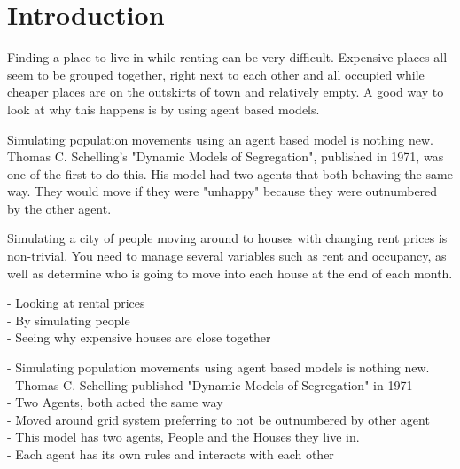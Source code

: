 \section{Introduction}

\par
Finding a place to live in while renting can be very difficult. Expensive places all seem to be grouped together, right next to each other and all occupied while cheaper places are on the outskirts of town and relatively empty.  A good way to look at why this happens is by using agent based models.

\par
Simulating population movements using an agent based model is nothing new. Thomas C. Schelling's "Dynamic Models of Segregation", published in 1971, was one of the first to do this. His model had two agents that both behaving the same way. They would move if they were "unhappy" because they were outnumbered by the other agent.

\par
Simulating a city of people moving around to houses with changing rent prices is non-trivial. You need to manage several variables such as rent and occupancy, as well as determine who is going to move into each house at the end of each month. 

\par
- Looking at rental prices \\
- By simulating people \\
- Seeing why expensive houses are close together \\

\par
- Simulating population movements using agent based models is nothing new. \\
- Thomas C. Schelling published "Dynamic Models of Segregation" in 1971 \\
  - Two Agents, both acted the same way \\
  - Moved around grid system preferring to not be outnumbered by other agent \\
- This model has two agents, People and the Houses they live in. \\
- Each agent has its own rules and interacts with each other \\

